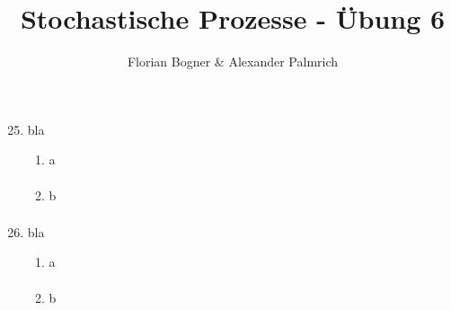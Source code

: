 \documentclass[a4paper,11pt,notitlepage,fullpage]{article}
\begin{document}
\author{Florian Bogner \& Alexander Palmrich}
\title{Stochastische Prozesse - Übung 6}
\maketitle

\begin{enumerate}
\setcounter{enumi}{24}


\item bla
\begin{enumerate}
\item a
\begin{align*}
\end{align*}

\item b
\begin{align*}
\end{align*}
\end{enumerate}


\item bla
\begin{enumerate}
\item a
\begin{align*}
\end{align*}

\item b
\begin{align*}
\end{align*}
\end{enumerate}


\end{enumerate}
\end{document}
